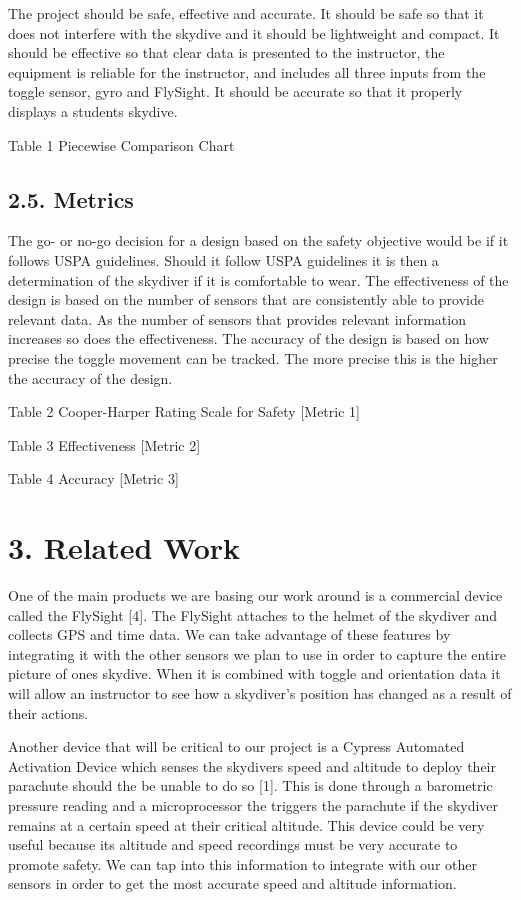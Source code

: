 \documentclass[10pt]{article}
\begin{document}
The project should be safe, effective and accurate. It should be safe so that it does not interfere with the skydive and it should be lightweight and compact. It should be effective so that clear data is presented to the instructor, the equipment is reliable for the instructor, and includes all three inputs from the toggle sensor, gyro and FlySight. It should be accurate so that it properly displays a students skydive.



Table 1 Piecewise Comparison Chart



\subsection{2.5. Metrics}

The go- or no-go decision for a design based on the safety objective would be if it follows USPA guidelines. Should it follow USPA guidelines it is then a determination of the skydiver if it is comfortable to wear. The effectiveness of the design is based on the number of sensors that are consistently able to provide relevant data. As the number of sensors that provides relevant information increases so does the effectiveness. The accuracy of the design is based on how precise the toggle movement can be tracked. The more precise this is the higher the accuracy of the design.



Table 2 Cooper-Harper Rating Scale for Safety [Metric 1]

Table 3 Effectiveness [Metric 2]

Table 4 Accuracy [Metric 3]



\section{3. Related Work}

One of the main products we are basing our work around is a commercial device called the FlySight [4]. The FlySight attaches to the helmet of the skydiver and collects GPS and time data. We can take advantage of these features by integrating it with the other sensors we plan to use in order to capture the entire picture of ones skydive. When it is combined with toggle and orientation data it will allow an instructor to see how a skydiver’s position has changed as a result of their actions.

Another device that will be critical to our project is a Cypress Automated Activation Device which senses the skydivers speed and altitude to deploy their parachute should the be unable to do so [1]. This is done through a barometric pressure reading and a microprocessor the triggers the parachute if the skydiver remains at a certain speed at their critical altitude. This device could be very useful because its altitude and speed recordings must be very accurate to promote safety. We can tap into this information to integrate with our other sensors in order to get the most accurate speed and altitude information.
\end{document}
